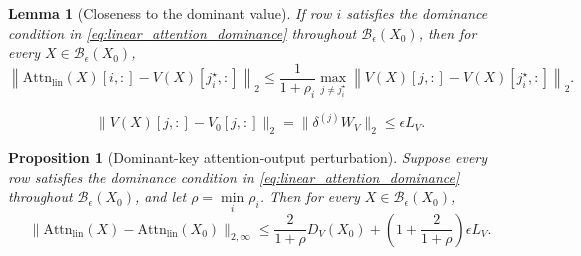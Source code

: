 \documentclass[10pt,a4paper]{amsart}
\newtheorem{lemma}{Lemma}
\newtheorem{proposition}{Proposition}
\begin{document}
\begin{lemma}[Closeness to the dominant value]
\label{lem:linear_dominant_closeness}
If row $i$ satisfies the dominance condition in \eqref{eq:linear_attention_dominance} throughout $\mathcal B_\epsilon(X_0)$, then for every $X\in\mathcal B_\epsilon(X_0)$,
\begin{equation}
    \left\|
    \mathrm{Attn}_{\mathrm{lin}}(X)[i,:]
    -
    V(X)[j_i^\star,:]
    \right\|_2
    \leq
    \frac{1}{1+\rho_i}
    \max_{j\neq j_i^\star}
    \left\|
    V(X)[j,:]-V(X)[j_i^\star,:]
    \right\|_2.
    \label{eq:app_linear_closeness}
\end{equation}
\end{lemma}

\begin{equation}
    \|V(X)[j,:]-V_0[j,:]\|_2
    =
    \|\delta^{(j)}W_V\|_2
    \leq
    \epsilon L_V.
    \label{eq:app_value_drift}
\end{equation}

\begin{proposition}[Dominant-key attention-output perturbation]
\label{prop:linear_attention_perturbation}
Suppose every row satisfies the dominance condition in \eqref{eq:linear_attention_dominance} throughout $\mathcal B_\epsilon(X_0)$, and let $\rho=\min\limits_i\rho_i$. Then for every $X\in\mathcal B_\epsilon(X_0)$,
\begin{equation}
    \|\mathrm{Attn}_{\mathrm{lin}}(X)-\mathrm{Attn}_{\mathrm{lin}}(X_0)\|_{2,\infty}
    \leq
    \frac{2}{1+\rho}D_V(X_0)
    +
    \left(
        1+\frac{2}{1+\rho}
    \right)
    \epsilon L_V.
    \label{eq:app_linear_attention_bound}
\end{equation}
\end{proposition}
\end{document}
